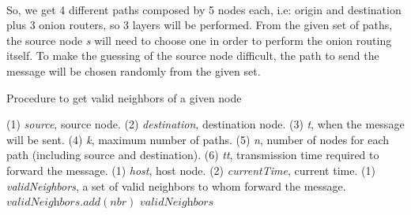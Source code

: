 \noindent{}\\

So, we get 4 different paths composed by 5 nodes each, i.e: origin and destination plus 3 onion routers, so 3 layers will be performed. From the given set of paths, the source node \textit{s} will need to choose one in order to perform the onion routing itself. To make the guessing of the source node difficult, the path to send the message will be chosen randomly from the given set.

\begin{algorithm}
\caption{Procedure to get valid neighbors of a given node}
\label{alg:get-neighbors}
\begin{algorithmic}[1]
\INHERIT (1) \textit{source}, source node. (2) \textit{destination}, destination node. (3) \textit{t}, when the message will be sent. (4) \textit{k}, maximum number of paths. (5) \textit{n}, number of nodes for each path (including source and destination). (6) \textit{tt}, transmission time required to forward the message.
\INPUT (1) \textit{host}, host node. (2) \textit{currentTime}, current time.
\OUTPUT (1) \textit{validNeighbors}, a set of valid neighbors to whom forward the message.
		\State $\textit{validNeighbors}.add(\textit{nbr})$
	\EndIf
\EndFor
\State \Return $\textit{validNeighbors}$
\EndProcedure
\end{algorithmic}
\end{algorithm}

